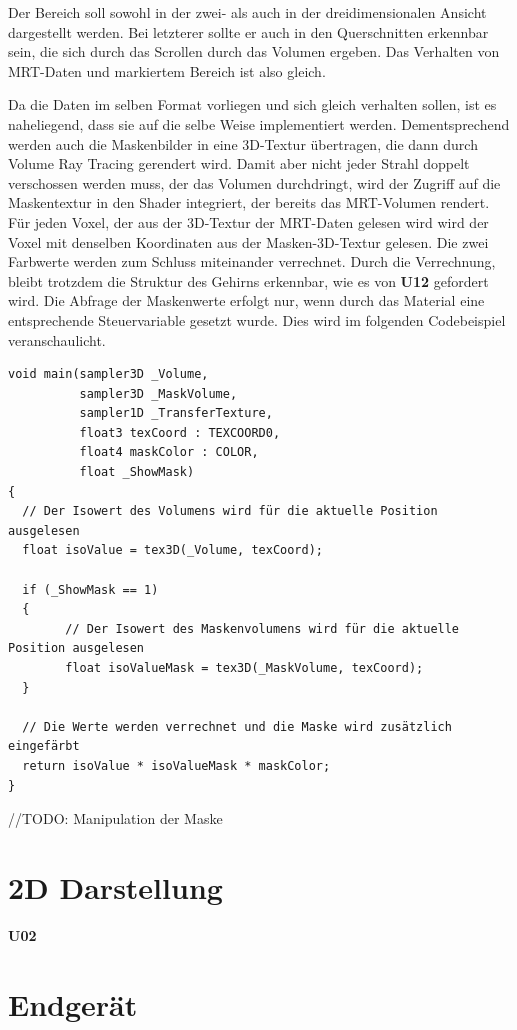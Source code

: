 Der Bereich soll sowohl in der zwei- als auch in der dreidimensionalen Ansicht dargestellt werden. Bei letzterer sollte er auch in den Querschnitten erkennbar sein, die sich durch das Scrollen durch das Volumen ergeben. Das Verhalten von MRT-Daten und markiertem Bereich ist also gleich.

Da die Daten im selben Format vorliegen und sich gleich verhalten sollen, ist es naheliegend, dass sie auf die selbe Weise implementiert werden. Dementsprechend werden auch die Maskenbilder in eine 3D-Textur übertragen, die dann durch Volume Ray Tracing gerendert wird. Damit aber nicht jeder Strahl doppelt verschossen werden muss, der das Volumen durchdringt, wird der Zugriff auf die Maskentextur in den Shader integriert, der bereits das MRT-Volumen rendert. Für jeden Voxel, der aus der 3D-Textur der MRT-Daten gelesen wird wird  der Voxel mit denselben Koordinaten aus der Masken-3D-Textur gelesen. Die zwei Farbwerte werden zum Schluss miteinander verrechnet. Durch die Verrechnung, bleibt trotzdem die Struktur des Gehirns erkennbar, wie es von \textbf{U12} gefordert wird. Die Abfrage der Maskenwerte erfolgt nur, wenn durch das Material eine entsprechende Steuervariable gesetzt wurde.
Dies wird im folgenden Codebeispiel veranschaulicht.

\begin{verbatim}
void main(sampler3D _Volume,
		  sampler3D _MaskVolume,
          sampler1D _TransferTexture,
          float3 texCoord : TEXCOORD0,
          float4 maskColor : COLOR,
          float _ShowMask)
{
  // Der Isowert des Volumens wird für die aktuelle Position ausgelesen
  float isoValue = tex3D(_Volume, texCoord);
  
  if (_ShowMask == 1)
  {
		// Der Isowert des Maskenvolumens wird für die aktuelle Position ausgelesen
		float isoValueMask = tex3D(_MaskVolume, texCoord);
  }
	
  // Die Werte werden verrechnet und die Maske wird zusätzlich eingefärbt
  return isoValue * isoValueMask * maskColor;
}
\end{verbatim}

//TODO:
Manipulation der Maske

\section{2D Darstellung}
\textbf{U02}
\section{Endgerät}

